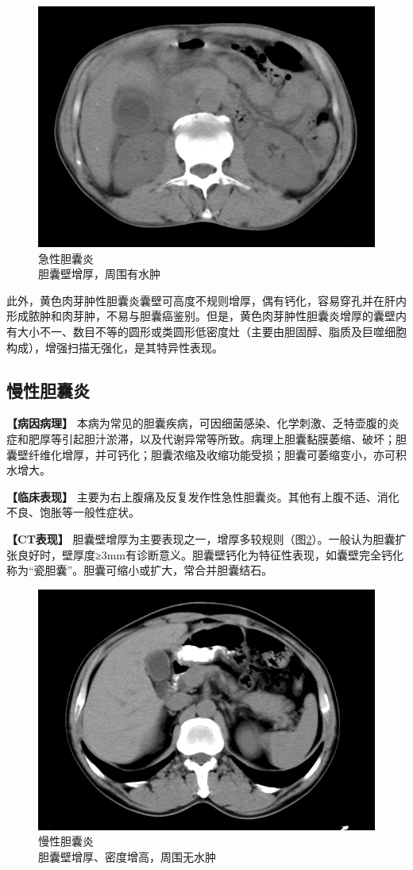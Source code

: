 \begin{figure}[!htbp]
 \centering
 \includegraphics[width=.7\textwidth,height=\textheight,keepaspectratio]{./images/Image00294.jpg}
 \captionsetup{justification=centering}
 \caption{急性胆囊炎\\{\small 胆囊壁增厚，周围有水肿}}
 \label{fig12-4}
  \end{figure} 

此外，黄色肉芽肿性胆囊炎囊壁可高度不规则增厚，偶有钙化，容易穿孔并在肝内形成脓肿和肉芽肿，不易与胆囊癌鉴别。但是，黄色肉芽肿性胆囊炎增厚的囊壁内有大小不一、数目不等的圆形或类圆形低密度灶（主要由胆固醇、脂质及巨噬细胞构成），增强扫描无强化，是其特异性表现。

\subsection{慢性胆囊炎}

\textbf{【病因病理】}
本病为常见的胆囊疾病，可因细菌感染、化学刺激、乏特壶腹的炎症和肥厚等引起胆汁淤滞，以及代谢异常等所致。病理上胆囊黏膜萎缩、破坏；胆囊壁纤维化增厚，并可钙化；胆囊浓缩及收缩功能受损；胆囊可萎缩变小，亦可积水增大。

\textbf{【临床表现】}
主要为右上腹痛及反复发作性急性胆囊炎。其他有上腹不适、消化不良、饱胀等一般性症状。

\textbf{【CT表现】}
胆囊壁增厚为主要表现之一，增厚多较规则（图\ref{fig12-5}）。一般认为胆囊扩张良好时，壁厚度≥3mm有诊断意义。胆囊壁钙化为特征性表现，如囊壁完全钙化称为“瓷胆囊”。胆囊可缩小或扩大，常合并胆囊结石。

\begin{figure}[!htbp]
 \centering
 \includegraphics[width=.7\textwidth,height=\textheight,keepaspectratio]{./images/Image00295.jpg}
 \captionsetup{justification=centering}
 \caption{慢性胆囊炎\\{\small 胆囊壁增厚、密度增高，周围无水肿}}
 \label{fig12-5}
  \end{figure} 


